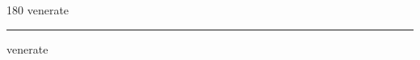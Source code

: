 
\begin{frame}
\begin{center}
\begin{turn}{180}
{\fontsize{2.5cm}{1em}\selectfont venerate}
\end{turn}
\vspace{1em}\par  
\hrule
\vspace{1em}\par  
{\fontsize{2.5cm}{1em}\selectfont venerate}
\end{center}
\end{frame}
